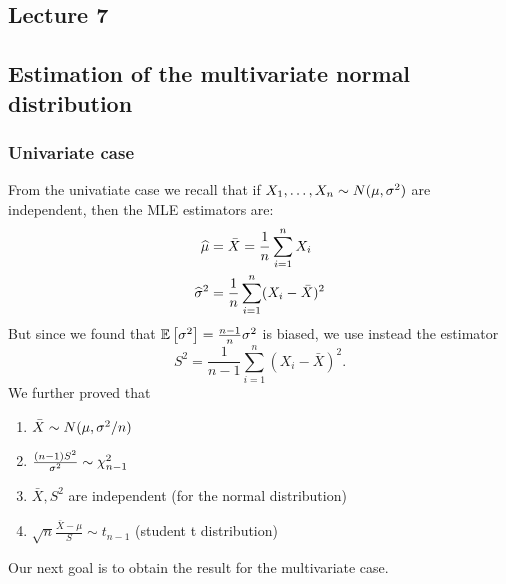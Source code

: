 \subsection*{Lecture 7}

\subsection{Estimation of the multivariate normal distribution}
\subsubsection{Univariate case}
From the univatiate case we recall that if $X_1,\dots,X_n \sim N(\mu, {\sigma^2})$ are independent, then the MLE estimators are:
\begin{align*}
    \widehat{\mu} &= \bar{X} = \frac{1}{n} \sum_{i=1}^n X_i \\
    \widehat{\sigma}^2 &= \frac{1}{n} \sum_{i=1}^n (X_i-\bar{X})^2
\end{align*}
But since we found that $\mathbb{E}\left[\sigma^2\right]=\frac{n-1}{n} \sigma^2$ is biased, we use instead the estimator
$$
    S^2 = \frac{1}{n-1} \sum_{i=1}^n (X_i-\bar{X})^2.
$$
We further proved that
\begin{enumerate}
    \item $\bar{X} \sim N(\mu, \sigma^2/n)$
    \item $\frac{(n-1)S^2}{\sigma^2} \sim \chi^2_{n-1}$
    \item $\bar{X}, S^2$ are independent (for the normal distribution)
    \item $\sqrt{n} \frac{\bar{X}-\mu}{S} \sim t_{n-1}$ (student t distribution)
\end{enumerate}
Our next goal is to obtain the result for the multivariate case. 
